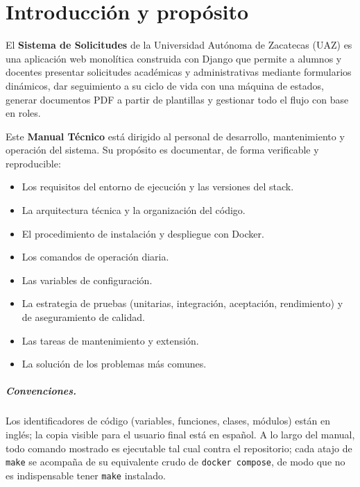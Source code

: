 \documentclass[12pt,letterpaper]{report}
\begin{document}
\tableofcontents\newpage

\chapter{Introducción y propósito}

El \textbf{Sistema de Solicitudes} de la Universidad Autónoma de Zacatecas (UAZ)
es una aplicación web monolítica construida con Django que permite a alumnos y
docentes presentar solicitudes académicas y administrativas mediante formularios
dinámicos, dar seguimiento a su ciclo de vida con una máquina de estados, generar
documentos PDF a partir de plantillas y gestionar todo el flujo con base en roles.

Este \textbf{Manual Técnico} está dirigido al personal de desarrollo,
mantenimiento y operación del sistema. Su propósito es documentar, de forma
verificable y reproducible:

\begin{itemize}[leftmargin=1.4em]
  \item Los requisitos del entorno de ejecución y las versiones del stack.
  \item La arquitectura técnica y la organización del código.
  \item El procedimiento de instalación y despliegue con Docker.
  \item Los comandos de operación diaria.
  \item Las variables de configuración.
  \item La estrategia de pruebas (unitarias, integración, aceptación,
        rendimiento) y de aseguramiento de calidad.
  \item Las tareas de mantenimiento y extensión.
  \item La solución de los problemas más comunes.
\end{itemize}

\paragraph{Convenciones.} Los identificadores de código (variables, funciones,
clases, módulos) están en inglés; la copia visible para el usuario final está en
español. A lo largo del manual, todo comando mostrado es ejecutable tal cual
contra el repositorio; cada atajo de \texttt{make} se acompaña de su equivalente
crudo de \texttt{docker compose}, de modo que no es indispensable tener
\texttt{make} instalado.
\end{document}
